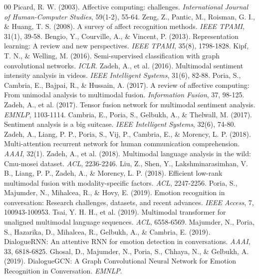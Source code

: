 \documentclass[sn-mathphys,Numbered]{sn-jnl}
\theoremstyle{thmstyleone}
\theoremstyle{thmstyletwo}
\theoremstyle{thmstylethree}
\begin{document}
\begin{thebibliography}{00}
 Picard, R. W. (2003). Affective computing: challenges. \textit{International Journal of Human-Computer Studies}, 59(1-2), 55-64.
 Zeng, Z., Pantic, M., Roisman, G. I., \& Huang, T. S. (2008). A survey of affect recognition methods. \textit{IEEE TPAMI}, 31(1), 39-58.
 Bengio, Y., Courville, A., \& Vincent, P. (2013). Representation learning: A review and new perspectives. \textit{IEEE TPAMI}, 35(8), 1798-1828.
 Kipf, T. N., \& Welling, M. (2016). Semi-supervised classification with graph convolutional networks. \textit{ICLR}.
 Zadeh, A., et al. (2016). Multimodal sentiment intensity analysis in videos. \textit{IEEE Intelligent Systems}, 31(6), 82-88.
 Poria, S., Cambria, E., Bajpai, R., \& Hussain, A. (2017). A review of affective computing: From unimodal analysis to multimodal fusion. \textit{Information Fusion}, 37, 98-125.
 Zadeh, A., et al. (2017). Tensor fusion network for multimodal sentiment analysis. \textit{EMNLP}, 1103-1114.
 Cambria, E., Poria, S., Gelbukh, A., \& Thelwall, M. (2017). Sentiment analysis is a big suitcase. \textit{IEEE Intelligent Systems}, 32(6), 74-80.
 Zadeh, A., Liang, P. P., Poria, S., Vij, P., Cambria, E., \& Morency, L. P. (2018). Multi-attention recurrent network for human communication comprehension. \textit{AAAI}, 32(1).
 Zadeh, A., et al. (2018). Multimodal language analysis in the wild: Cmu-mosei dataset. \textit{ACL}, 2236-2246.
 Liu, Z., Shen, Y., Lakshminarasimhan, V. B., Liang, P. P., Zadeh, A., \& Morency, L. P. (2018). Efficient low-rank multimodal fusion with modality-specific factors. \textit{ACL}, 2247-2256.
 Poria, S., Majumder, N., Mihalcea, R., \& Hovy, E. (2019). Emotion recognition in conversation: Research challenges, datasets, and recent advances. \textit{IEEE Access}, 7, 100943-100953.
 Tsai, Y. H. H., et al. (2019). Multimodal transformer for unaligned multimodal language sequences. \textit{ACL}, 6558-6569.
 Majumder, N., Poria, S., Hazarika, D., Mihalcea, R., Gelbukh, A., \& Cambria, E. (2019). DialogueRNN: An attentive RNN for emotion detection in conversations. \textit{AAAI}, 33, 6818-6825.
 Ghosal, D., Majumder, N., Poria, S., Chhaya, N., \& Gelbukh, A. (2019). DialogueGCN: A Graph Convolutional Neural Network for Emotion Recognition in Conversation. \textit{EMNLP}.

\end{thebibliography}
\end{document}

